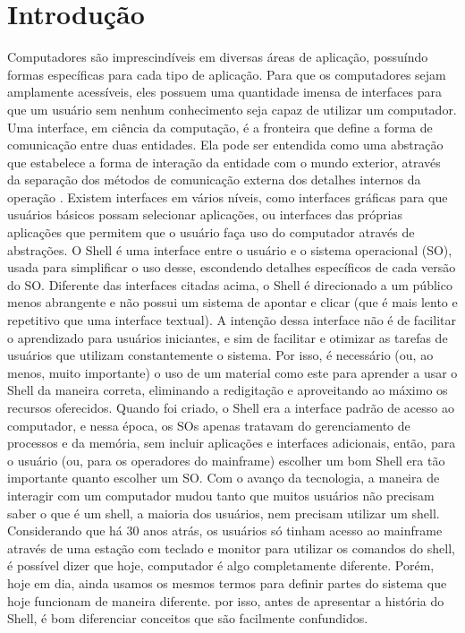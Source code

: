 \documentclass[oneside, 11 pt]{article}
\begin{document}
	\section{Introdução}
	Computadores são imprescindíveis em diversas áreas de aplicação, possuíndo formas específicas
	para cada tipo de aplicação. Para que os computadores sejam amplamente acessíveis,
	eles possuem uma quantidade imensa de interfaces para que um usuário sem nenhum conhecimento
	seja capaz de utilizar um computador. Uma interface, em ciência da computação, é
	a fronteira que define a forma de comunicação entre duas entidades. Ela pode ser entendida
	como uma abstração que estabelece a forma de interação da entidade com o mundo exterior,
	através da separação dos métodos de comunicação externa dos detalhes internos da operação
	\cite{interface}. Existem interfaces em vários níveis, como interfaces gráficas para
	que usuários básicos possam selecionar aplicações, ou interfaces das próprias aplicações que
	permitem que o usuário faça uso do computador através de abstrações.
	O Shell é uma interface entre o usuário e o sistema operacional (SO), usada para simplificar
	o uso desse, escondendo detalhes específicos de cada versão do SO. Diferente das
	interfaces citadas acima, o Shell é direcionado a um público menos abrangente e não possui
	um sistema de apontar e clicar (que é mais lento e repetitivo que uma interface textual). A
	intenção dessa interface não é de facilitar o aprendizado para usuários iniciantes, e sim de
	facilitar e otimizar as tarefas de usuários que utilizam constantemente o sistema. Por isso, é
	necessário (ou, ao menos, muito importante) o uso de um material como este para aprender
	a usar o Shell da maneira correta, eliminando a redigitação e aproveitando ao máximo os
	recursos oferecidos.
	Quando foi criado, o Shell era a interface padrão de acesso ao computador, e nessa época,
	os SOs apenas tratavam do gerenciamento de processos e da memória, sem incluir aplicações e interfaces adicionais, então, para o usuário (ou, para os operadores do mainframe) escolher
	um bom Shell era tão importante quanto escolher um SO.
	Com o avanço da tecnologia, a maneira de interagir com um computador mudou tanto
	que muitos usuários não precisam saber o que é um shell, a maioria dos usuários, nem
	precisam utilizar um shell. Considerando que há 30 anos atrás, os usuários só tinham acesso
	ao mainframe através de uma estação com teclado e monitor para utilizar os comandos do
	shell, é possível dizer que hoje, computador é algo completamente diferente. Porém, hoje
	em dia, ainda usamos os mesmos termos para definir partes do sistema que hoje funcionam
	de maneira diferente. por isso, antes de apresentar a história do Shell, é bom diferenciar
	conceitos que são facilmente confundidos.
	
\end{document}
